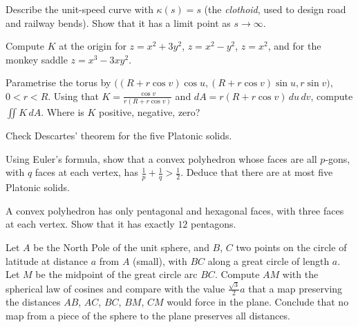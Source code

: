 \begin{exercise}[$\star\star$]\label{ex:clothoid}
Describe the unit-speed curve with $\kappa(s)=s$ (the \emph{clothoid}, used to design road and railway bends). Show that it has a limit point as $s\to\infty$.
\end{exercise}

\begin{exercise}[$\star$]\label{ex:surfacesK}
Compute $K$ at the origin for $z=x^2+3y^2$, $z=x^2-y^2$, $z=x^2$, and for the monkey saddle $z=x^3-3xy^2$.
\end{exercise}

\begin{exercise}[$\star\star$]\label{ex:torusK}
Parametrise the torus by $\bigl((R+r\cos v)\cos u,(R+r\cos v)\sin u,r\sin v\bigr)$, $0<r<R$. Using that $K=\frac{\cos v}{r(R+r\cos v)}$ and
$dA=r(R+r\cos v)\,du\,dv$, compute $\iint K\,dA$. Where is $K$ positive, negative, zero?
\end{exercise}

\begin{exercise}[$\star$]\label{ex:platonic}
Check Descartes' theorem for the five Platonic solids.
\end{exercise}

\begin{exercise}[$\star\star$]\label{ex:fiveplatonic}
Using Euler's formula, show that a convex polyhedron whose faces are all $p$-gons, with $q$ faces at each vertex, has $\frac1p+\frac1q>\frac12$. Deduce that there
are at most five Platonic solids.
\end{exercise}

\begin{exercise}[$\star$]\label{ex:football}
A convex polyhedron has only pentagonal and hexagonal faces, with three faces at each vertex. Show that it has exactly $12$ pentagons.
\end{exercise}

\begin{exercise}[$\star\star$]\label{ex:nomap}
Let $A$ be the North Pole of the unit sphere, and $B$, $C$ two points on the circle of latitude at distance $a$ from $A$ (small), with $BC$ along a great circle of length
$a$. Let $M$ be the midpoint of the great circle arc $BC$. Compute $AM$ with the spherical law of cosines and compare with the value $\frac{\sqrt3}2a$ that a map
preserving the distances $AB$, $AC$, $BC$, $BM$, $CM$ would force in the plane. Conclude that no map from a piece of the sphere to the plane preserves all distances.
\end{exercise}

